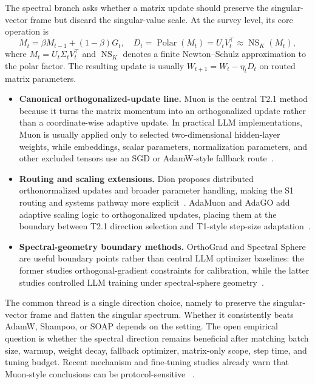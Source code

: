 The spectral branch asks whether a matrix update should preserve the
singular-vector frame but discard the singular-value scale.  At the survey
level, its core operation is
\begin{equation}
  M_t=\beta M_{t-1}+(1-\beta)G_t,\quad
  D_t=\operatorname{Polar}(M_t)
      = U_tV_t^\top
      \approx \operatorname{NS}_K(M_t),
  \label{eq:t2-spectral-template}
\end{equation}
where $M_t=U_t\Sigma_tV_t^\top$ and $\operatorname{NS}_K$ denotes a finite
Newton--Schulz approximation to the polar factor.  The resulting update is
usually $W_{t+1}=W_t-\eta_tD_t$ on routed matrix parameters.
\begin{itemize}
  \setlength{\itemsep}{2pt}
  \item \textbf{Canonical orthogonalized-update line.}  Muon is the central
  T2.1 method because it turns the matrix momentum into an orthogonalized
  update rather than a coordinate-wise adaptive update.  In practical LLM
  implementations, Muon is usually applied only to selected two-dimensional
  hidden-layer weights, while embeddings, scalar parameters, normalization
  parameters, and other excluded tensors use an SGD or AdamW-style fallback
  route~\citep{jordan2024muon}.
  \item \textbf{Routing and scaling extensions.}  Dion proposes distributed
  orthonormalized updates and broader parameter handling, making the S1
  routing and systems pathway more explicit~\citep{ahn2025dion}.  AdaMuon and
  AdaGO add adaptive scaling logic to orthogonalized updates, placing them at
  the boundary between T2.1 direction selection and T1-style step-size
  adaptation~\citep{si2025adamuon,zhang2025adagrad}.
  \item \textbf{Spectral-geometry boundary methods.}  OrthoGrad and Spectral
  Sphere are useful boundary points rather than central LLM optimizer
  baselines: the former studies orthogonal-gradient constraints for
  calibration, while the latter studies controlled LLM training under
  spectral-sphere geometry~\citep{hedges2025orthograd,xie2026controlled}.
\end{itemize}

The common thread is a single direction choice, namely to preserve the
singular-vector frame and flatten the singular spectrum.  Whether it
consistently beats AdamW, Shampoo, or SOAP depends on the setting.  The open
empirical question is whether the spectral direction remains beneficial after
matching batch size, warmup, weight decay, fallback optimizer, matrix-only
scope, step time, and tuning budget.  Recent mechanism and fine-tuning studies already warn that
Muon-style conclusions can be protocol-sensitive
~\citep{qu2026muonfinetune,shumaylov2026muonnot}.

